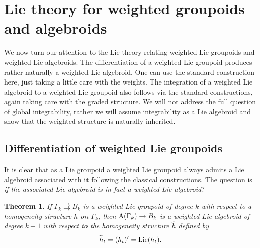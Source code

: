 \documentclass[pdftex]{sigma}
\newcommand{\rmA}{\textnormal{A}}
\newcommand{\Lie}{\textnormal{Lie}}
\numberwithin{equation}{section}
\newtheorem{Theorem}{Theorem}[section]
\begin{document}
\section{Lie theory for weighted groupoids and algebroids}\label{sec:Lie theory}

We now turn our attention to the Lie theory relating weighted Lie groupoids and weighted Lie algebroids. The dif\/ferentiation of a weighted Lie groupoid produces rather naturally a weighted Lie algebroid. One can use the standard construction here, just taking a little care with the weights. The integration of a weighted Lie algebroid to a weighted Lie groupoid also follows via the standard constructions, again taking care with the graded structure. We will not address the full question of global integrability, rather we will assume integrability as a Lie algebroid and show that the weighted structure is naturally inherited.

\subsection{Dif\/ferentiation of weighted Lie groupoids}
It is clear  that as a Lie groupoid a weighted Lie groupoid always admits a Lie algebroid associated with it following the classical constructions. The question is \emph{if the associated Lie algebroid is in fact a weighted Lie algebroid}?

\begin{Theorem}\label{thm:groupoids to algebroids}
If $\Gamma_{k} \rightrightarrows B_{k}$ is a weighted Lie groupoid of degree $k$ with respect to a homogeneity structure $h$ on $\Gamma_k$, then $\rmA(\Gamma_{k}) \rightarrow B_{k}$ is a weighted Lie algebroid of degree $k+1$ with respect to the homogeneity structure $\widehat{h}$ defined by
\begin{gather}\label{wh}
\widehat{h}_t=(h_t)'=\Lie(h_t) .
\end{gather}
\end{Theorem}
\end{document}
